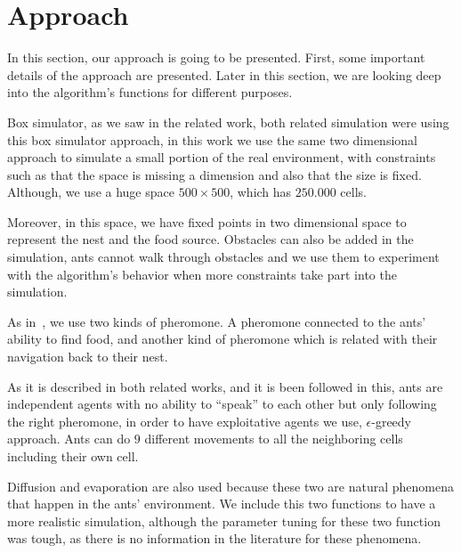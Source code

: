 \documentclass[paper=a4, fontsize=11pt]{scrartcl} %
\numberwithin{equation}{section} %
\numberwithin{figure}{section} %
\numberwithin{table}{section} %
\begin{document}
\section{Approach}
\label{approach}
In this section, our approach is going to be presented. First, some important details of the approach are presented. Later in this section, we are looking deep into the algorithm's functions for different purposes.

Box simulator, as we saw in the related work, both related simulation were using this box simulator approach, in this work we use the same two dimensional approach to simulate a small portion of the real environment, with constraints such as that the space is missing a dimension and also that the size is fixed. Although, we use a huge space $500 \times 500$, which has $250.000$ cells.

Moreover, in this space, we have fixed points in two dimensional space to represent the nest and the food source. Obstacles can also be added in the simulation, ants cannot walk through obstacles and we use them to experiment with the algorithm's behavior when more constraints take part into the simulation.

As in~\cite{2}, we use two kinds of pheromone. A pheromone connected to the ants' ability to find food, and another kind of pheromone which is related with their navigation back to their nest.

As it is described in both related works, and it is been followed in this, ants are independent agents with no ability to ``speak'' to each other but only following the right pheromone, in order to have exploitative agents we use, $\epsilon$-greedy approach. Ants can do $9$ different movements to all the neighboring cells including their own cell.

Diffusion and evaporation are also used because these two are natural phenomena that happen in the ants' environment. We include this two functions to have a more realistic simulation, although the parameter tuning for these two function was tough, as there is no information in the literature for these phenomena.
\end{document}
